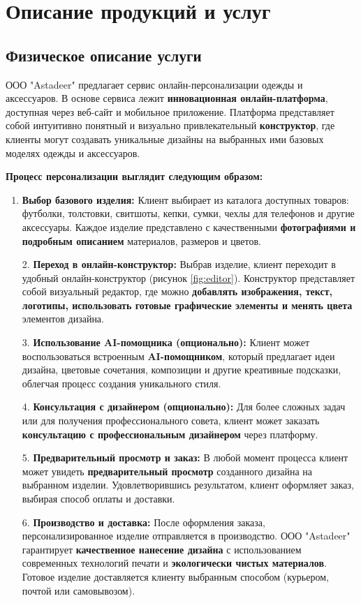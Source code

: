 \section{Описание продукций и услуг}

\subsection{Физическое описание услуги}

ООО "Astadeer" предлагает сервис онлайн-персонализации одежды и аксессуаров.  В основе сервиса лежит \textbf{инновационная онлайн-платформа}, доступная через веб-сайт и мобильное приложение.  Платформа представляет собой интуитивно понятный и визуально привлекательный \textbf{конструктор}, где клиенты могут создавать уникальные дизайны на выбранных ими базовых моделях одежды и аксессуаров.

\vspace{0.3cm}

\textbf{Процесс персонализации выглядит следующим образом:}

\begin{enumerate}[label=\arabic*.]
    \item  \textbf{Выбор базового изделия:} Клиент выбирает из каталога доступных товаров: футболки, толстовки, свитшоты, кепки, сумки, чехлы для телефонов и другие аксессуары.  Каждое изделие представлено с качественными \textbf{фотографиями и подробным описанием} материалов, размеров и цветов.
    \item [2. ] \textbf{Переход в онлайн-конструктор:}  Выбрав изделие, клиент переходит в удобный онлайн-конструктор (рисунок \ref{fig:editor}).  Конструктор представляет собой визуальный редактор, где можно \textbf{добавлять изображения, текст, логотипы, использовать готовые графические элементы и менять цвета} элементов дизайна.
    \item [3. ] \textbf{Использование AI-помощника (опционально):}  Клиент может воспользоваться встроенным \textbf{AI-помощником}, который предлагает идеи дизайна, цветовые сочетания, композиции и другие креативные подсказки, облегчая процесс создания уникального стиля.
    \item [4. ] \textbf{Консультация с дизайнером (опционально):}  Для более сложных задач или для получения профессионального совета, клиент может заказать \textbf{консультацию с профессиональным дизайнером} через платформу.
    \item [5. ] \textbf{Предварительный просмотр и заказ:}  В любой момент процесса клиент может увидеть \textbf{предварительный просмотр} созданного дизайна на выбранном изделии.  Удовлетворившись результатом, клиент оформляет заказ, выбирая способ оплаты и доставки.
    \item [6. ] \textbf{Производство и доставка:}  После оформления заказа, персонализированное изделие отправляется в производство.  ООО "Astadeer" гарантирует \textbf{качественное нанесение дизайна} с использованием современных технологий печати и \textbf{экологически чистых материалов}.  Готовое изделие доставляется клиенту выбранным способом (курьером, почтой или самовывозом).
\end{enumerate}

